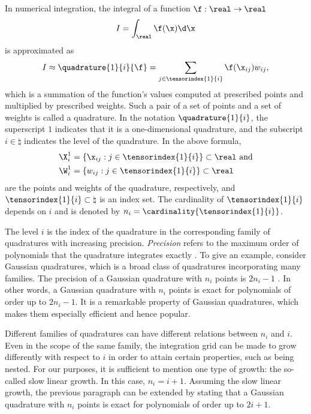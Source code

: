 In numerical integration, the integral of a function $\f: \real \to \real$
\[
  I = \int_\real \f(\x) \d \x
\]
is approximated as
\[
  I \approx \quadrature{1}{i}{\f}
  = \sum_{j \in \tensorindex{1}{i}} \f(\x_{ij}) w_{ij},
\]
which is a summation of the function's values computed at prescribed points and
multiplied by prescribed weights. Such a pair of a set of points and a set of
weights is called a quadrature. In the notation $\quadrature{1}{i}$, the
superscript $1$ indicates that it is a one-dimensional quadrature, and the
subscript $i \in \natural$ indicates the level of the quadrature. In the above
formula,
\begin{align*}
  & \X^1_i = \{ \x_{ij}: j \in \tensorindex{1}{i} \} \subset \real \text{ and} \\
  & \W^1_i = \{ w_{ij}: j \in \tensorindex{1}{i} \} \subset \real
\end{align*}
are the points and weights of the quadrature, respectively, and
$\tensorindex{1}{i} \subset \natural$ is an index set. The cardinality of
$\tensorindex{1}{i}$ depends on $i$ and is denoted by $n_i =
\cardinality{\tensorindex{1}{i}}$.

The level $i$ is the index of the quadrature in the corresponding family of
quadratures with increasing precision. \emph{Precision} refers to the maximum
order of polynomials that the quadrature integrates exactly \cite{heiss2008}. To
give an example, consider Gaussian quadratures, which is a broad class of
quadratures incorporating many families. The precision of a Gaussian quadrature
with $n_i$ points is $2 n_i - 1$ \cite{heiss2008}. In other words, a Gaussian
quadrature with $n_i$ points is exact for polynomials of order up to $2 n_i -
1$. It is a remarkable property of Gaussian quadratures, which makes them
especially efficient and hence popular.

Different families of quadratures can have different relations between $n_i$ and
$i$. Even in the scope of the same family, the integration grid can be made to
grow differently with respect to $i$ in order to attain certain properties, such
as being nested. For our purposes, it is sufficient to mention one type of
growth: the so-called slow linear growth. In this case, $n_i = i + 1$. Assuming
the slow linear growth, the previous paragraph can be extended by stating that a
Gaussian quadrature with $n_i$ points is exact for polynomials of order up to $2
i + 1$.

